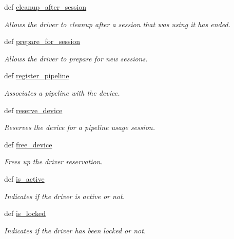 \begin{DoxyCompactItemize}
def \hyperlink{classhwm_1_1hardware_1_1devices_1_1drivers_1_1driver_1_1_driver_a309dc49356c392d593ff3cfa5f431dc2}{cleanup\-\_\-after\-\_\-session}
\begin{DoxyCompactList}\small\item\em Allows the driver to cleanup after a session that was using it has ended. \end{DoxyCompactList}\item 
def \hyperlink{classhwm_1_1hardware_1_1devices_1_1drivers_1_1driver_1_1_driver_adccc990f0884e5a4d2c895199fa589ef}{prepare\-\_\-for\-\_\-session}
\begin{DoxyCompactList}\small\item\em Allows the driver to prepare for new sessions. \end{DoxyCompactList}\item 
def \hyperlink{classhwm_1_1hardware_1_1devices_1_1drivers_1_1driver_1_1_driver_adedcca0374fe97f63ea68bbec40c007e}{register\-\_\-pipeline}
\begin{DoxyCompactList}\small\item\em Associates a pipeline with the device. \end{DoxyCompactList}\item 
def \hyperlink{classhwm_1_1hardware_1_1devices_1_1drivers_1_1driver_1_1_driver_a4a0e7f3e92be74e6cf97e7829f33f99b}{reserve\-\_\-device}
\begin{DoxyCompactList}\small\item\em Reserves the device for a pipeline usage session. \end{DoxyCompactList}\item 
def \hyperlink{classhwm_1_1hardware_1_1devices_1_1drivers_1_1driver_1_1_driver_a87ba55eac7d89db6053808b95ddb7bc3}{free\-\_\-device}
\begin{DoxyCompactList}\small\item\em Frees up the driver reservation. \end{DoxyCompactList}\item 
def \hyperlink{classhwm_1_1hardware_1_1devices_1_1drivers_1_1driver_1_1_driver_a7a558987448f3954745c8bcf3955ada7}{is\-\_\-active}
\begin{DoxyCompactList}\small\item\em Indicates if the driver is active or not. \end{DoxyCompactList}\item 
def \hyperlink{classhwm_1_1hardware_1_1devices_1_1drivers_1_1driver_1_1_driver_a8c6170ea0e61bb395ea69313d456a473}{is\-\_\-locked}
\begin{DoxyCompactList}\small\item\em Indicates if the driver has been locked or not. \end{DoxyCompactList}\end{DoxyCompactItemize}
